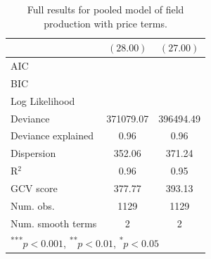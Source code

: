 \documentclass[12pt]{article}
\begin{document}
\begin{table}
\begin{center}
\begin{tabular}{l c c }
                                     & $(28.00)$        & $(27.00)$        \\
\hline
AIC                                  &                  &                  \\
BIC                                  &                  &                  \\
Log Likelihood                       &                  &                  \\
Deviance                             & 371079.07        & 396494.49        \\
Deviance explained                   & 0.96             & 0.96             \\
Dispersion                           & 352.06           & 371.24           \\
R$^2$                                & 0.96             & 0.95             \\
GCV score                            & 377.77           & 393.13           \\
Num. obs.                            & 1129             & 1129             \\
Num. smooth terms                    & 2                & 2                \\
\hline
\multicolumn{3}{l}{\scriptsize{\textsuperscript{***}$p<0.001$, 
  \textsuperscript{**}$p<0.01$, 
  \textsuperscript{*}$p<0.05$}}
\end{tabular}
\caption{Full results for pooled model of field production with price terms.}
\label{table:pooled}
\end{center}
\end{table} 


\end{document}
